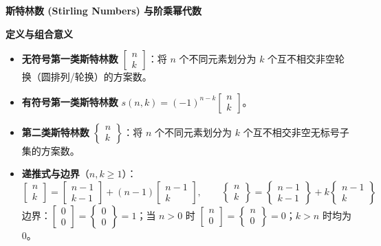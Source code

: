\textbf{斯特林数 (Stirling Numbers) 与阶乘幂代数}

\textbf{定义与组合意义}
\begin{itemize}
    \item \textbf{无符号第一类斯特林数} $\left[ \begin{matrix} n \\ k \end{matrix} \right]$：将 $n$ 个不同元素划分为 $k$ 个互不相交非空轮换（圆排列/轮换）的方案数。
    \item \textbf{有符号第一类斯特林数} $s(n, k) = (-1)^{n-k} \left[ \begin{matrix} n \\ k \end{matrix} \right]$。
    \item \textbf{第二类斯特林数} $\left\{ \begin{matrix} n \\ k \end{matrix} \right\}$：将 $n$ 个不同元素划分为 $k$ 个互不相交非空无标号子集的方案数。
    \item \textbf{递推式与边界}（$n, k \ge 1$）：
    \[
    \left[ \begin{matrix} n \\ k \end{matrix} \right] = \left[ \begin{matrix} n-1 \\ k-1 \end{matrix} \right] + (n-1) \left[ \begin{matrix} n-1 \\ k \end{matrix} \right], \qquad
    \left\{ \begin{matrix} n \\ k \end{matrix} \right\} = \left\{ \begin{matrix} n-1 \\ k-1 \end{matrix} \right\} + k \left\{ \begin{matrix} n-1 \\ k \end{matrix} \right\}
    \]
    边界：$\left[ \begin{matrix} 0 \\ 0 \end{matrix} \right] = \left\{ \begin{matrix} 0 \\ 0 \end{matrix} \right\} = 1$；当 $n > 0$ 时 $\left[ \begin{matrix} n \\ 0 \end{matrix} \right] = \left\{ \begin{matrix} n \\ 0 \end{matrix} \right\} = 0$；$k > n$ 时均为 $0$。
\end{itemize}

